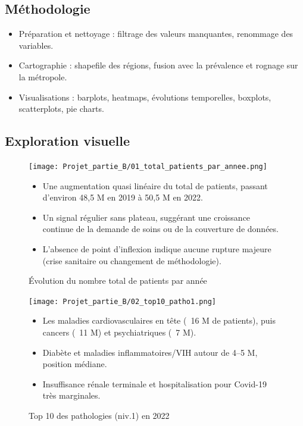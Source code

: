 \documentclass[12pt,a4paper]{article}
\begin{document}
\subsection{Méthodologie}
\begin{itemize}
  \item Préparation et nettoyage : filtrage des valeurs manquantes, renommage des variables.
  \item Cartographie : shapefile des régions, fusion avec la prévalence et rognage sur la métropole.
  \item Visualisations : barplots, heatmaps, évolutions temporelles, boxplots, scatterplots, pie charts.
\end{itemize}

\subsection{Exploration visuelle}

\begin{figure}[H]
  \centering
  \begin{minipage}[t]{0.52\textwidth}
    \centering
    \texttt{[image: Projet\_partie\_B/01\_total\_patients\_par\_annee.png]}
    \caption{Évolution du nombre total de patients par année}
    \label{fig:total_patients}
  \end{minipage}
  \hfill
  \begin{minipage}[t]{0.48\textwidth}
    \small
    \begin{itemize}
      \item Une augmentation quasi linéaire du total de patients, passant d’environ 48,5 M en 2019 à 50,5 M en 2022.  
      \item Un signal régulier sans plateau, suggérant une croissance continue de la demande de soins ou de la couverture de données.  
      \item L’absence de point d'inflexion indique aucune rupture majeure (crise sanitaire ou changement de méthodologie).  
    \end{itemize}
  \end{minipage}
\end{figure}

\begin{figure}[H]
  \centering
  \begin{minipage}[t]{0.6\textwidth}
    \centering
    \texttt{[image: Projet\_partie\_B/02\_top10\_patho1.png]}
    \caption{Top 10 des pathologies (niv.1) en 2022}
    \label{fig:top10_patho}
  \end{minipage}
  \hfill
    \begin{itemize}
      \item Les maladies cardiovasculaires en tête (~16 M de patients), puis cancers (~11 M) et psychiatriques (~7 M).  
      \item Diabète et maladies inflammatoires/VIH autour de 4–5 M, position médiane.  
      \item Insuffisance rénale terminale et hospitalisation pour Covid-19 très marginales.  
    \end{itemize}
\end{figure}
\end{document}

